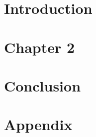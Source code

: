 \providecommand{\main}{.}








{\hypersetup{hidelinks}
	\tableofcontents  %
}

\chapter{Introduction}


\chapter{Chapter 2}


\chapter{Conclusion}


\appendix
\chapter{Appendix}




